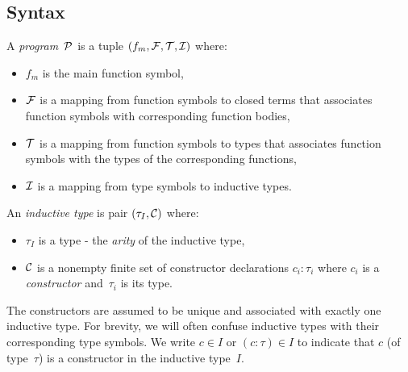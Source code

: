 \documentclass[
    9pt,            %
    techreport,        %
    affiltop,       %
]{art}
\begin{document}
\subsection{Syntax}\label{sec_syntax}

A \JuvixCore{} \emph{program}~$\mathcal{P}$ is a tuple $(f_m,\mathcal{F},\mathcal{T},\mathcal{I})$ where:
\begin{itemize}
\item $f_m$ is the main function symbol,
\item $\mathcal{F}$ is a mapping from function symbols to closed terms that associates function symbols with corresponding function bodies,
\item $\mathcal{T}$ is a mapping from function symbols to types that associates function symbols with the types of the corresponding functions,
\item $\mathcal{I}$ is a mapping from type symbols to inductive types.
\end{itemize}
An \emph{inductive type} is pair $(\tau_I,\mathcal{C})$ where:
\begin{itemize}
\item $\tau_I$ is a type - the \emph{arity} of the inductive type,
\item $\mathcal{C}$ is a nonempty finite set of constructor declarations $c_i : \tau_i$ where $c_i$ is a \emph{constructor} and~$\tau_i$ is its type.
\end{itemize}
The constructors are assumed to be unique and associated with exactly one inductive type. For brevity, we will often confuse inductive types with their corresponding type symbols. We write $c \in I$ or $(c : \tau) \in I$ to indicate that $c$ (of type~$\tau$) is a constructor in the inductive type~$I$.
\end{document}
